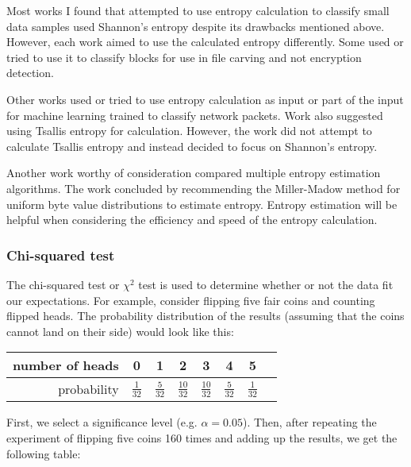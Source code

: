 \documentclass[
  digital, %
  oneside, %
  lof,     %
  lot,     %
]{fithesis4}
\begin{document}
Most works I found that attempted to use entropy calculation to classify small data samples used Shannon's entropy despite its drawbacks mentioned above.
However, each work aimed to use the calculated entropy differently.
Some used\cite{foster12} or tried to use\cite{garfmccar15} it to classify blocks for use in file carving and not encryption detection.

Other works used\cite{wazhguli11} or tried to use\cite{bebapeshrara18} entropy calculation as input or part of the input for machine learning trained to classify network packets.
Work\cite{wazhguli11} also suggested using Tsallis entropy for calculation. However, the work did not attempt to calculate Tsallis entropy and instead decided to focus on Shannon's entropy.

Another work worthy of consideration\cite{fiallegon19} compared multiple entropy estimation algorithms.
The work concluded by recommending the Miller-Madow method for uniform byte value distributions to estimate entropy.
Entropy estimation will be helpful when considering the efficiency and speed of the entropy calculation.

\subsubsection{Chi-squared test}
\label{sss:chi2test}
The chi-squared test or $\chi^2$ test is used to determine whether or not the data fit our expectations.\cite{pearson00}
For example, consider flipping five fair coins and counting flipped heads.
The probability distribution of the results (assuming that the coins cannot land on their side) would look like this:

\begin{center}
    \begin{tabular}{ r | c c c c c c c }
        number of heads & 0 & 1 & 2 & 3 & 4 & 5 \\ \hline
        probability & $\frac{1}{32}$ & $\frac{5}{32}$ & $\frac{10}{32}$ & $\frac{10}{32}$ & $\frac{5}{32}$ & $\frac{1}{32}$
    \end{tabular}
\end{center}

First, we select a significance level (e.g. $\alpha = 0.05$).
Then, after repeating the experiment of flipping five coins 160 times and adding up the results, we get the following table: 
\end{document}
